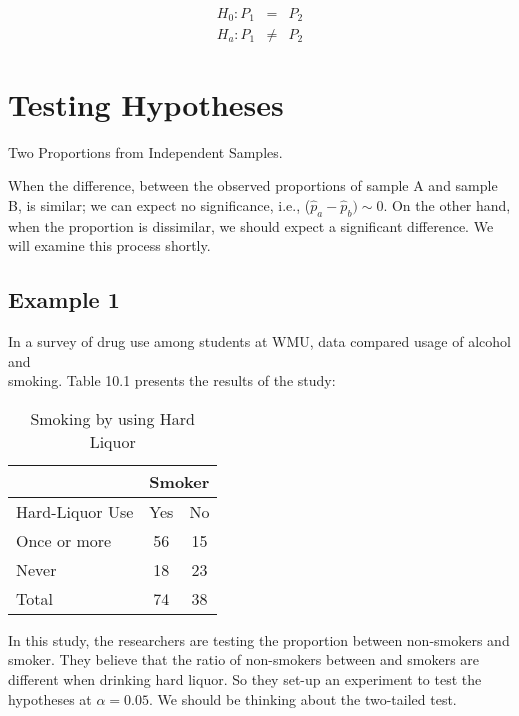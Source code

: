 \documentclass[11pt]{book}\usepackage[]{graphicx}\usepackage[]{color}
\begin{document}
\begin{eqnarray*}
  H_0: P_1 &=& P_2 \\
  H_a: P_1 &\ne& P_2
\end{eqnarray*}

\section{Testing Hypotheses }

Two Proportions from Independent Samples.

When the difference, between the observed proportions of sample A and sample B, is similar; we can expect no significance, i.e., ($\hat{p}_a - \hat{p}_b) \sim 0$.  On the other hand, when the proportion is dissimilar, we should expect a significant difference.  We will examine this process shortly.

\subsection{Example 1}

In a survey of drug use among students at WMU, data compared usage of alcohol and \\ smoking. Table 10.1 presents the results of the study:

\begin{table}[htbp]
   \centering
   \caption{Smoking by using Hard Liquor}
   \begin{tabular}{@{} lcc @{}} \hline %
     &  \multicolumn{2}{c}{Smoker} \\ \hline
     Hard-Liquor Use & Yes & No \\ \hline
     Once or more & 56 & 15 \\
     Never        & 18 & 23 \\  \hline
     Total        & 74 & 38 \\ \hline
   \end{tabular}

   \label{tab:c10_1}
\end{table}

In this study, the researchers are testing the proportion between non-smokers and \\ smoker.  They believe that the ratio of non-smokers between and smokers are different when drinking hard liquor.  So they set-up an experiment to test the hypotheses at $\alpha = 0.05$.  We should be thinking about the two-tailed test.
\end{document}
